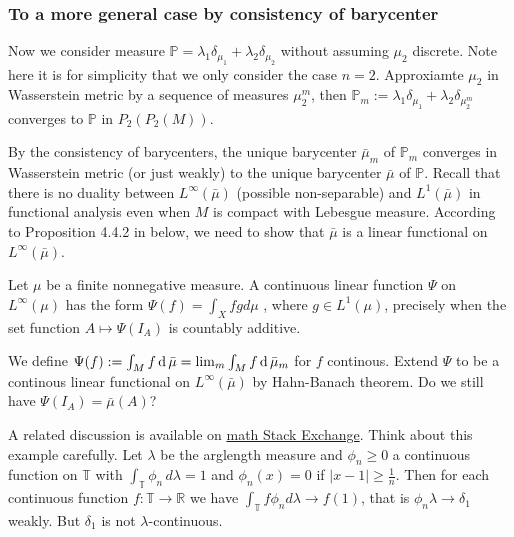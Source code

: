 
\subsubsection{To a more general case by consistency of barycenter}

Now we consider measure $\mathbb{P} = \lambda_1 \delta_{\mu_1} + \lambda_2 \delta_{\mu_2}$
without assuming $\mu_2$ discrete.
Note here it is for simplicity that we only consider the case $n=2$.
Approxiamte $\mu_2$ in Wasserstein metric by a sequence of measures $\mu_2^{m}$,
then $\mathbb{P}_m := \lambda_1 \delta_{\mu_1} + \lambda_2 \delta_{\mu_2^m}$ converges to $\mathbb{P}$
in $P_2(P_2(M))$.

By the consistency of barycenters, the unique barycenter $\bar{\mu}_m$ of $\mathbb{P}_m$
converges in Wasserstein metric (or just weakly) to the unique barycenter $\bar{\mu}$ of $\mathbb{P}$.
Recall that there is no duality between $L^{\infty}(\bar{\mu})$ (possible non-separable) and $L^1 (\bar{\mu})$
in functional analysis even when $M$ is compact with Lebesgue measure.
According to Proposition 4.4.2 in \cite{Bogachev2007} below, we need to show that $\bar{\mu}$ is a linear functional on $L^{\infty}(\bar{\mu})$.
\begin{prop}
	Let \( \mu \) be a finite nonnegative measure.
	A continuous linear function \( \Psi \) on \( L ^ { \infty } ( \mu ) \) has the form
	\( \Psi ( f ) = \int _ { X } f g d \mu \)
	, where \( g \in L ^ { 1 } ( \mu ) \),
	precisely when the set function \( A \mapsto \Psi \left( I _ { A } \right) \) is countably additive.
\end{prop}

We define $\Psi(f):= \int_M f \operatorname{d} \bar{\mu} = \lim_m \int_M f \operatorname{d} \bar{\mu}_m$ for $f$ continous.
Extend $\Psi$ to be a continous linear functional on $L^{\infty}(\bar{\mu})$ by Hahn-Banach theorem.
Do we still have $\Psi(I_A) = \bar{\mu}(A)$?

A related discussion is available on
\href{https://math.stackexchange.com/questions/574130/does-weak-convergence-with-uniformly-bounded-densities-imply-absolute-continuity/574888#574888}{math Stack Exchange}.
Think about this example carefully.
Let $\lambda$ be the arglength measure and $\phi_n \ge 0$ a continuous function on $\mathbb T$ with $\int_{\mathbb T} \phi_n\, d\lambda = 1$ and $\phi_n(x) = 0$ if $|x-1| \ge \frac 1n$. Then for each continuous function $f\colon \mathbb T \to \mathbb R$ we have $\int_{\mathbb T} f\phi_n d\lambda \to f(1)$, that is $\phi_n \lambda \to \delta_1$ weakly. But $\delta_1$ is not $\lambda$-continuous.

